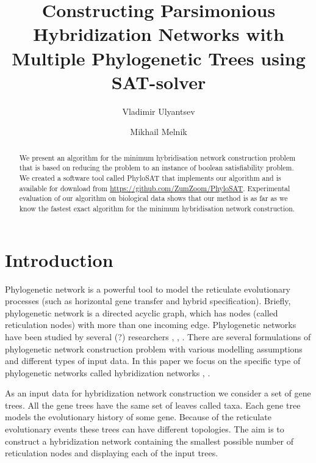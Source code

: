 \documentclass[runningheads, envcountsame, a4paper]{llncs}
\begin{document}
\mainmatter           
\title{Constructing Parsimonious Hybridization Networks with Multiple Phylogenetic Trees using SAT-solver}
\titlerunning{ } 
\toctitle{ }

\author{Vladimir Ulyantsev \and Mikhail Melnik}

\maketitle
\setcounter{footnote}{0}

\begin{abstract}
  We present an algorithm for the minimum hybridisation network construction problem that is based on reducing 
  the problem to an instance of boolean satisfiability problem. We created a software tool called PhyloSAT  
  that implements our algorithm and is available for download from \url{https://github.com/ZumZoom/PhyloSAT}.
  Experimental evaluation of our algorithm on biological data shows that our method is as far as we know the 
  fastest exact algorithm for the minimum hybridisation network construction.

\end{abstract}

\section{Introduction}

Phylogenetic network is a powerful tool to model the reticulate
evolutionary processes (such as horizontal gene transfer and hybrid specification).
Briefly, phylogenetic network is a directed acyclic graph, which has
nodes (called reticulation nodes) with more than one incoming edge. Phylogenetic
networks have been studied by several (?) researchers \cite{huson2010phylogenetic}, \cite{morrison2011introduction}, 
\cite{nakhleh2011evolutionary}. There are several formulations of phylogenetic network
construction problem with various modelling assumptions and different types of input data. 
In this paper we focus on the specific type of phylogenetic networks called hybridization
networks \cite{semple2006hybridization}, \cite{chen2010hybridnet}.

As an input data for hybridization network construction we consider a set of gene trees. 
All the gene trees have the same set of leaves called taxa.
Each gene tree models the evolutionary history of some gene. 
Because of the reticulate evolutionary events these trees can have different topologies.
The aim is to construct a hybridization network containing the smallest possible number of 
reticulation nodes and displaying each of the input trees. 
\end{document}
